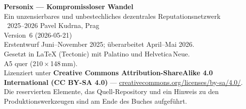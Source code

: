 \thispagestyle{empty}
\ifdefined\printmode\vspace*{\fill}\else{}\fi
\begin{flushleft}\small\sffamily
\textbf{Personix --- Kompromissloser Wandel}\\[0.3em]
Ein unzensierbares und unbestechliches dezentrales Reputationsnetzwerk\\[1.4em]

\textcopyright\ 2025--2026 Pavel Kudrna, Prag\\[0.4em]

Version~6 (2026-05-21)\\
Erstentwurf Juni--November 2025; überarbeitet April--Mai 2026.\\[1.4em]

Gesetzt in \LaTeX{} (Tectonic) mit Palatino und Helvetica\,Neue.\\
A5 quer (210\,$\times$\,148\,mm).\\[1.4em]

Lizenziert unter \textbf{Creative Commons Attribution-ShareAlike 4.0
International (CC BY-SA 4.0)} ---
\href{https://creativecommons.org/licenses/by-sa/4.0/}{creativecommons.org/licenses/by-sa/4.0/}.
Die reservierten Elemente, das Quell-Repository und ein Hinweis zu den
Produktionswerkzeugen sind am Ende des Buches aufgeführt.
\end{flushleft}
\ifdefined\printmode\else{}\fi
\clearpage
